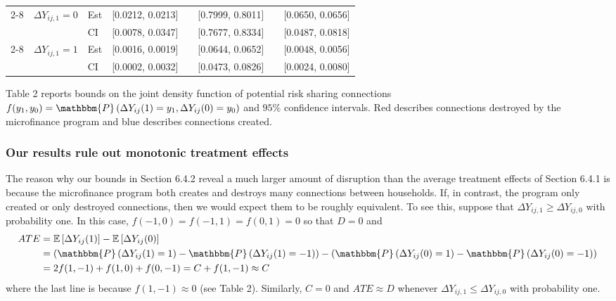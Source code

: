 \documentclass[12pt]{article}
\theoremstyle{definition}
\begin{document}
\begin{table}[htbp]
\begin{tabular}{cclccccc}
\cmidrule{2-8}          & \multirow{2}[2]{*}{$\Delta Y_{ij,1} = 0$} & Est   & \textcolor[rgb]{ .188,  .329,  .588}{[0.0212, 0.0213]} &       & [0.7999, 0.8011] &       & \textcolor[rgb]{ .753,  0,  0}{[0.0650, 0.0656]} \\
          &       & CI    & \textcolor[rgb]{ .188,  .329,  .588}{[0.0078, 0.0347]} &       & [0.7677, 0.8334] &       & \textcolor[rgb]{ .753,  0,  0}{[0.0487, 0.0818]} \\
\cmidrule{2-8}          & \multirow{2}[2]{*}{$\Delta Y_{ij,1} = 1$} & Est   & \textcolor[rgb]{ .188,  .329,  .588}{[0.0016, 0.0019]} &       & \textcolor[rgb]{ .188,  .329,  .588}{[0.0644, 0.0652]} &       & [0.0048, 0.0056] \\
          &       & CI    & \textcolor[rgb]{ .188,  .329,  .588}{[0.0002, 0.0032]} &       & \textcolor[rgb]{ .188,  .329,  .588}{[0.0473, 0.0826]} &       & [0.0024, 0.0080] \\
    \hline\hline
    \end{tabular}%
    \vspace{-5mm}
	\begin{flushleft} \footnotesize \linespread{.75} Table 2 reports bounds on the joint density function of potential risk sharing connections $f(y_1,y_0) = \mathbbm{P}\left( \Delta Y_{ij}(1) = y_1, \Delta Y_{ij}(0) = y_0\right)$ and $95\%$ confidence intervals. \textcolor[rgb]{ .753,  0,  0}{Red} describes connections destroyed by the microfinance program and \textcolor[rgb]{ 0,  .439,  .753}{blue} describes connections created.\normalsize \end{flushleft}
\end{table}%


\subsubsection{Our results rule out monotonic treatment effects}
The reason why our bounds in Section 6.4.2 reveal a much larger amount of disruption than the average treatment effects of Section 6.4.1 is because the microfinance program both creates and destroys many connections between households. If, in contrast, the program only created or only destroyed connections, then we would expect them to be roughly equivalent. To see this, suppose that $\Delta Y_{ij,1} \geq \Delta Y_{ij,0}$  with probability one. In this case, $f(-1,0) = f(-1,1) = f(0,1) = 0$ so that $D = 0$ and   
\begin{align*}
ATE &=  \mathbb{E}\left[\Delta Y_{ij}(1)\right] -  \mathbb{E}\left[\Delta Y_{ij}(0)\right] \\
&= \left(\mathbbm{P}\left(\Delta Y_{ij}(1) = 1\right) - \mathbbm{P}\left(\Delta Y_{ij}(1) = -1\right) \right) 
-  \left(\mathbbm{P}\left(\Delta Y_{ij}(0) = 1\right) - \mathbbm{P}\left(\Delta Y_{ij}(0) = -1\right)\right) \\
& = 2f(1,-1) + f(1,0) + f(0,-1) = C + f(1,-1) \approx C
\end{align*}
where the last line is because $f(1,-1) \approx 0$ (see Table 2). Similarly, $C = 0$ and $ATE \approx D$ whenever $\Delta Y_{ij,1} \leq \Delta Y_{ij,0}$ with probability one.   
\end{document}
